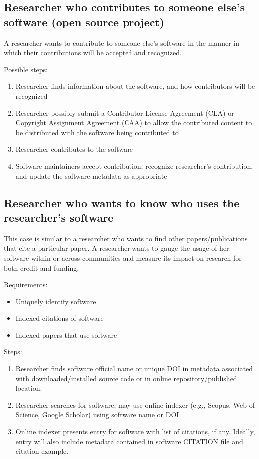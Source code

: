 \documentclass[12pt, oneside]{amsart}
\begin{document}
\subsection{Researcher who contributes to someone else's software (open source project)}

A researcher wants to contribute to someone else's software in the manner in which their contributions will be accepted and recognized.

Possible steps:
\begin{enumerate}
\item Researcher finds information about the software, and how contributors will be recognized
\item Researcher possibly submit a Contributor License Agreement (CLA) or Copyright Assignment Agreement (CAA) to allow the contributed content to be distributed with the software being contributed to
\item Researcher contributes to the software
\item Software maintainers accept contribution, recognize researcher's contribution, and update the software metadata as appropriate
\end{enumerate}

\subsection{Researcher who wants to know who uses the researcher's software}

This case is similar to a researcher who wants to find other papers/publications that cite a particular paper.
A researcher wants to gauge the usage of her software within or across communities and measure its impact on research for both credit and funding.

Requirements:
\begin{itemize}
\item Uniquely identify software
\item Indexed citations of software
\item Indexed papers that use software
\end{itemize}

Steps:
\begin{enumerate}
\item Researcher finds software official name or unique DOI in metadata associated with downloaded/installed source code or in online repository/published location.
\item Researcher searches for software, may use online indexer (e.g., Scopus, Web of Science, Google Scholar) using software name or DOI.
\item Online indexer presents entry for software with list of citations, if any.
Ideally, entry will also include metadata contained in software CITATION file and citation example.
\end{enumerate}
\end{document}
